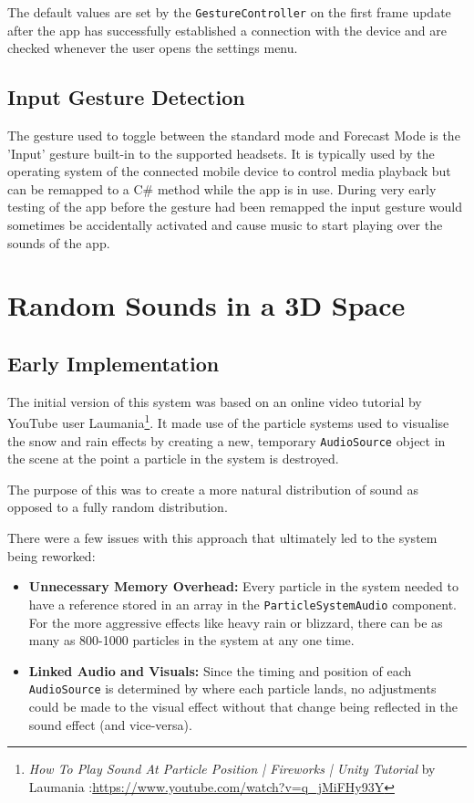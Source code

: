\documentclass{l4proj}
\begin{document}
The default values are set by the \texttt{GestureController} on the first frame update after the app has successfully established a connection with the device and are checked whenever the user opens the settings menu.

\subsection{Input Gesture Detection}

The gesture used to toggle between the standard mode and Forecast Mode is the 'Input' gesture built-in to the supported headsets. It is typically used by the operating system of the connected mobile device to control media playback but can be remapped to a C\# method while the app is in use.  During very early testing of the app before the gesture had been remapped the input gesture would sometimes be accidentally activated and cause music to start playing over the sounds of the app.

\section{Random Sounds in a 3D Space}

\subsection{Early Implementation}

The initial version of this system was based on an online video tutorial by YouTube user Laumania\footnote{\emph{How To Play Sound At Particle Position | Fireworks | Unity Tutorial} by Laumania :\url{https://www.youtube.com/watch?v=q_jMiFHy93Y}}. It made use of the particle systems used to visualise the snow and rain effects by creating a new, temporary \texttt{AudioSource} object in the scene at the point a particle in the system is destroyed.

The purpose of this was to create a more natural distribution of sound as opposed to a fully random distribution.

There were a few issues with this approach that ultimately led to the system being reworked: \begin{itemize}
    \item \textbf{Unnecessary Memory Overhead: } Every particle in the system needed to have a reference stored in an array in the \texttt{ParticleSystemAudio} component. For the more aggressive effects like heavy rain or blizzard, there can be as many as 800-1000 particles in the system at any one time.
    \item \textbf{Linked Audio and Visuals: } Since the timing and position of each \texttt{AudioSource} is determined by where each particle lands, no adjustments could be made to the visual effect without that change being reflected in the sound effect (and vice-versa).
\end{itemize}
\end{document}
